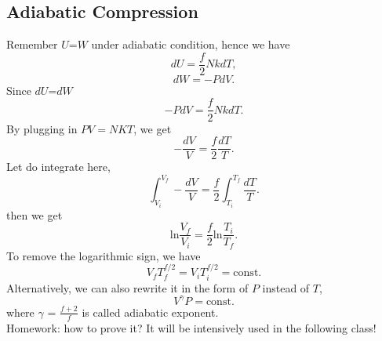 \subsection{Adiabatic Compression}
Remember $U$=$W$ under adiabatic condition, hence we have 
\begin{equation} \label{du} dU = \frac{f}{2}NkdT, \end{equation}
\begin{equation} \label{dW} dW = -PdV. \end{equation}
Since $dU$=$dW$
\begin{equation} \label{duw1} -PdV = \frac{f}{2}NkdT. \end{equation}
By plugging in $PV = NKT$, we get
\begin{equation} \label{duw2} -\frac{dV}{V} = \frac{f}{2} \frac{dT}{T}. \end{equation}
Let do integrate here,
\begin{equation} \label{duw3} \int_{V_{i}}^{V_{f}}  -\frac{dV}{V} = \frac{f}{2} \int_{T_{i}}^{T_{f}} \frac{dT}{T}. \end{equation}
then we get
\begin{equation} \label{duw4} \textrm{ln}\frac{V_f}{V_i} = \frac{f}{2} \textrm{ln}\frac{T_i}{T_f}. \end{equation}
To remove the logarithmic sign, we have 
\begin{equation} \label{duw5} V_fT_f^{f/2} = V_iT_i^{f/2} = \textrm{const}. \end{equation}
Alternatively, we can also rewrite it in the form of $P$ instead of $T$,
\begin{equation} \label{duw6} V^{\gamma}P = \textrm{const}. \end{equation}
where ${\gamma}$ = $\frac{f+2}{f}$ is called adiabatic exponent.\\
Homework: how to prove it? It will be intensively used in the following class!

{}

